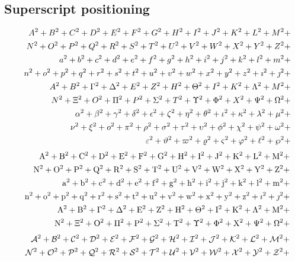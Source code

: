 \documentclass{article}
\def\test#1{#1}
\def\testupperi{%
  \test A \test B \test C \test D \test E \test F \test G \test H
  \test I \test J \test K \test L \test M }
\def\testupperii{%
  \test N \test O \test P \test Q \test R \test S \test T \test U
  \test V \test W \test X \test Y \test Z }
\def\testloweri{%
  \test a \test b \test c \test d \test e \test f \test g \test h
  \test i \test j \test k \test l \test m }
\def\testlowerii{%
  \test n \test o \test p \test q \test r \test s \test t \test u
  \test v \test w \test x \test y \test z 
  \test\imath \test\jmath }
\def\testupgreeki{%
  \test A \test B \test\Gamma \test\Delta \test E \test Z \test H
  \test\Theta \test I \test K \test\Lambda \test M }
\def\testupgreekii{%
  \test N \test\Xi \test O \test\Pi \test P \test\Sigma \test T
  \test\Upsilon \test\Phi \test X \test\Psi \test\Omega 
}
\def\testlowgreeki{%
  \test\alpha \test\beta \test\gamma \test\delta \test\epsilon
  \test\zeta \test\eta \test\theta \test\iota \test\kappa \test\lambda
  \test\mu }
\def\testlowgreekii{%
  \test\nu \test\xi \test o \test\pi \test\rho \test\sigma \test\tau
  \test\upsilon \test\phi \test\chi \test\psi \test\omega }
\def\testlowgreekiii{%
  \test\varepsilon \test\vartheta \test\varpi \test\varrho
  \test\varsigma \test\varphi \test\ell \test\wp}
\begin{document}
\clearpage
\subsection{Superscript positioning}

\def\test#1{#1^{2}+}%
\begin{eqnarray*}
  && {\testupperi}\\
  && {\testupperii}\\
  && {\testloweri}\\ 
  && {\testlowerii}\\ 
  && {\testupgreeki}\\
  && {\testupgreekii}\\
  && {\testlowgreeki}\\
  && {\testlowgreekii}\\
  && {\testlowgreekiii}
\end{eqnarray*}%
%
\def\test#1{\mathrm{#1}^{2}+}%
\begin{eqnarray*}
  && {\testupperi}\\
  && {\testupperii}\\
  && {\testloweri}\\ 
  && {\testlowerii}\\ 
  && {\testupgreeki}\\
  && {\testupgreekii}
\end{eqnarray*}%
%
%
%
\def\test#1{\mathcal{#1}^{2}+}%
\begin{eqnarray*}
  && {\testupperi}\\
  && {\testupperii}
\end{eqnarray*}%
\end{document}
